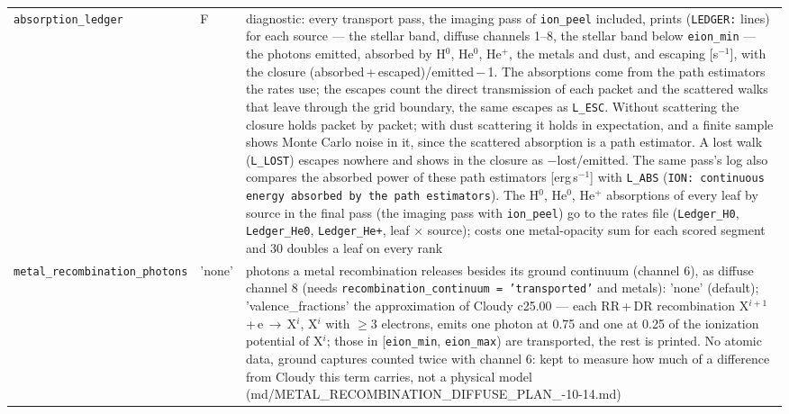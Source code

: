 \documentclass[english,a4paper]{my_memo}
\newcommand{\code}[1]{\texttt{#1}}
\begin{document}
{\begin{longtable}{llp{7.2cm}}
\code{absorption\_ledger} & F & diagnostic: every transport pass, the imaging pass of \code{ion\_peel} included, prints (\code{LEDGER:} lines) for each source --- the stellar band, diffuse channels 1--8, the stellar band below \code{eion\_min} --- the photons emitted, absorbed by H$^0$, He$^0$, He$^+$, the metals and dust, and escaping [s$^{-1}$], with the closure (absorbed\,+\,escaped)/emitted\,$-$\,1.  The absorptions come from the path estimators the rates use; the escapes count the direct transmission of each packet and the scattered walks that leave through the grid boundary, the same escapes as \code{L\_ESC}.  Without scattering the closure holds packet by packet; with dust scattering it holds in expectation, and a finite sample shows Monte Carlo noise in it, since the scattered absorption is a path estimator.  A lost walk (\code{L\_LOST}) escapes nowhere and shows in the closure as $-$lost/emitted.  The same pass's log also compares the absorbed power of these path estimators [erg\,s$^{-1}$] with \code{L\_ABS} (\code{ION: continuous energy absorbed by the path estimators}).  The H$^0$, He$^0$, He$^+$ absorptions of every leaf by source in the final pass (the imaging pass with \code{ion\_peel}) go to the rates file (\code{Ledger\_H0}, \code{Ledger\_He0}, \code{Ledger\_He+}, leaf $\times$ source); costs one metal-opacity sum for each scored segment and 30 doubles a leaf on every rank \\
\code{metal\_recombination\_photons} & 'none' & photons a metal recombination releases besides its ground continuum (channel 6), as diffuse channel 8 (needs \code{recombination\_continuum = 'transported'} and metals): 'none' (default); 'valence\_fractions' the approximation of Cloudy c25.00 --- each RR\,+\,DR recombination X$^{i+1}$\,+\,e\,$\to$\,X$^{i}$, X$^{i}$ with $\ge 3$ electrons, emits one photon at 0.75 and one at 0.25 of the ionization potential of X$^{i}$; those in [\code{eion\_min}, \code{eion\_max}) are transported, the rest is printed.  No atomic data, ground captures counted twice with channel 6: kept to measure how much of a difference from Cloudy this term carries, not a physical model (md/METAL\_RECOMBINATION\_\allowbreak DIFFUSE\_PLAN\_\allowbreak 2026-10-14.md) \\

\end{longtable}}
\end{document}
